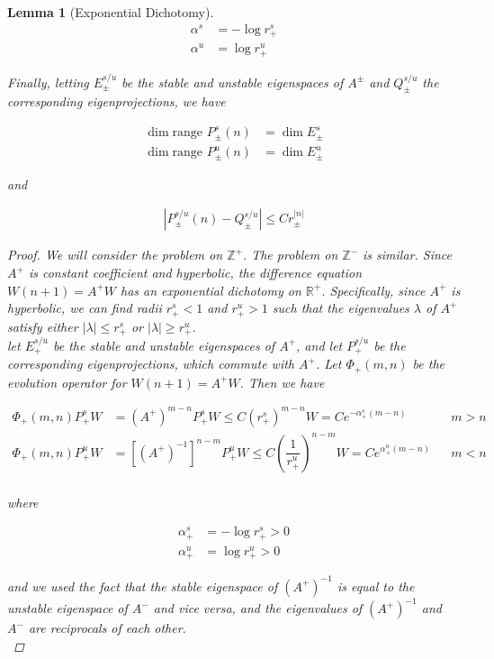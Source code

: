 \documentclass[12pt]{article}
\def\R{{\mathbb R}}
\def\Z{{\mathbb Z}}
\newtheorem{lemma}{Lemma}
\begin{document}
\begin{lemma}[Exponential Dichotomy]
\begin{align*}
\alpha^s &= -\log r_+^s\\
\alpha^u &= \log r_+^u
\end{align*}
 
Finally, letting $E_\pm^{s/u}$ be the stable and unstable eigenspaces of $A^\pm$ and $Q_\pm^{s/u}$ the corresponding eigenprojections, we have

\begin{align*}
\dim \text{range }P_\pm^s(n) &= \dim E_\pm^s \\
\dim \text{range }P_\pm^u(n) &= \dim E_\pm^u
\end{align*}

and

\begin{align}\label{projbound}
| P_\pm^{s/u}(n) - Q_\pm^{s/u} | \leq C r_\pm^{|n|}
\end{align}

\begin{proof}
We will consider the problem on $\Z^+$. The problem on $\Z^-$ is similar. Since $A^+$ is constant coefficient and hyperbolic, the difference equation $W(n+1) = A^+ W$ has an exponential dichotomy on $\R^+$. Specifically, since $A^+$ is hyperbolic, we can find radii $r_+^s < 1$ and $r_+^u > 1$ such that the eigenvalues $\lambda$ of $A^+$ satisfy either $|\lambda| \leq r_+^s$ or $|\lambda| \geq r_+^u$.\\

let $E_+^{s/u}$ be the stable and unstable eigenspaces of $A^+$, and let $P_+^{s/u}$ be the corresponding eigenprojections, which commute with $A^+$. Let $\Phi_+(m, n)$ be the evolution operator for $W(n+1) = A^+ W$. Then we have

\begin{align*}
\Phi_+(m, n) P_+^s W &= (A^+)^{m-n} P_+^s W \leq C (r_+^s)^{m-n} W = C e^{-\alpha_+^s (m - n)} && m > n \\
\Phi_+(m, n) P_+^u W &= [(A^+)^{-1}]^{n-m} P_+^u W \leq C \left( \dfrac{1}{r_+^u} \right)^{n-m} W = C e^{\alpha_+^u (m - n)} && m < n \\
\end{align*}

where 

\begin{align*}
\alpha_+^s &= -\log r_+^s > 0 \\
\alpha_+^u &= \log r_+^u > 0
\end{align*}

and we used the fact that the stable eigenspace of $(A^+)^{-1}$ is equal to the unstable eigenspace of $A^-$ and vice versa, and the eigenvalues of $(A^+)^{-1}$ and $A^-$ are reciprocals of each other.\\


\end{proof}
\end{lemma}
\end{document}
